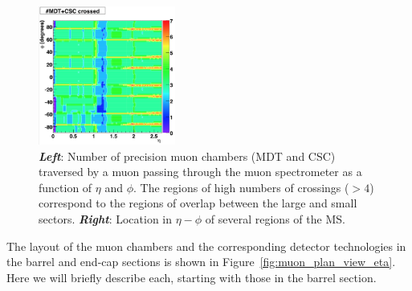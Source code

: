 \begin{figure}[!htb]
    \begin{center}
        \includegraphics[width=0.4\textwidth]{figures/chapter2/muon_spec/atlas_ms_nchamber_crossed}
        \caption{
            \textbf{\textit{Left}}: Number of precision muon chambers (MDT and CSC) traversed by a muon passing through the muon
                spectrometer as a function of $\eta$ and $\phi$.
                The regions of high numbers of crossings ($>4$) correspond to the regions of overlap
                between the large and small sectors.
            \textbf{\textit{Right}}: Location in $\eta-\phi$ of several regions of the MS.
        }
        \label{fig:muon_nchambers_crossed}
    \end{center}
\end{figure}
\FloatBarrier

The layout of the muon chambers and the corresponding detector technologies
in the barrel and end-cap sections is shown in Figure~\ref{fig:muon_plan_view_eta}.
Here we will briefly describe each, starting with those in the barrel section.

